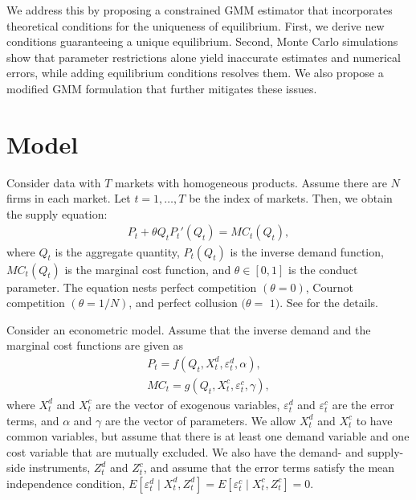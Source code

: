 \documentclass[11pt, a4paper]{article}
\theoremstyle{remark}
\begin{document}
We address this by proposing a constrained GMM estimator that incorporates theoretical conditions for the uniqueness of equilibrium.
First, we derive new conditions guaranteeing a unique equilibrium.
Second, Monte Carlo simulations show that parameter restrictions alone yield inaccurate estimates and numerical errors, while adding equilibrium conditions resolves them.
We also propose a modified GMM formulation that further mitigates these issues.

\section{Model}
Consider data with $T$ markets with homogeneous products.
Assume there are $N$ firms in each market.
Let $t = 1,\ldots, T$ be the index of markets.
Then, we obtain the supply equation:
\begin{align}
     P_t + \theta Q_{t} P_t'(Q_{t})= MC_t(Q_{t}),\label{eq:supply_equation}
\end{align}
where $Q_{t}$ is the aggregate quantity, $P_t(Q_{t})$ is the inverse demand function, $MC_{t}(Q_{t})$ is the marginal cost function, and $\theta\in[0,1]$ is the conduct parameter. 
The equation nests perfect competition $(\theta=0)$, Cournot competition $(\theta=1 / N)$, and perfect collusion $(\theta=$ $1)$. See \citet{bresnahan1982oligopoly} for the details.

Consider an econometric model.
Assume that the inverse demand and the marginal cost functions are given as
\begin{align*}
    P_t = f(Q_{t}, X^{d}_{t}, \varepsilon^{d}_{t}, \alpha), %
    \\
    MC_t = g(Q_{t}, X^{c}_{t}, \varepsilon^{c}_{t}, \gamma),%
\end{align*}
where $X^{d}_{t}$ and $X^{c}_{t}$ are the vector of exogenous variables, $\varepsilon^{d}_{t}$ and $\varepsilon^{c}_{t}$ are the error terms, and $\alpha$ and $\gamma$ are the vector of parameters.
We allow $X^{d}_{t}$ and $X^{c}_{t}$ to have common variables, but assume that there is at least one demand variable and one cost variable that are mutually excluded.
We also have the demand- and supply-side instruments, $Z^{d}_{t}$ and $Z^{c}_{t}$, and assume that the error terms satisfy the mean independence condition, $E[\varepsilon^{d}_{t}\mid X^{d}_{t}, Z^{d}_{t}] = E[\varepsilon^{c}_{t} \mid X^{c}_{t}, Z^{c}_{t}] =0$. 
\end{document}
